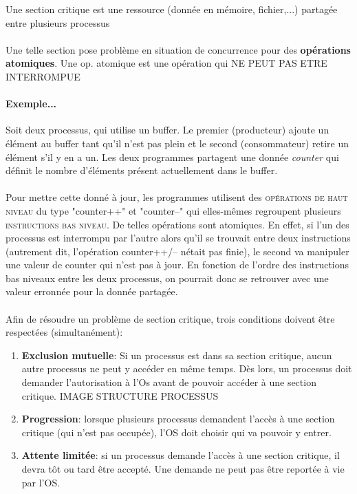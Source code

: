 \item{}
{
 Une section critique est une ressource (donnée en mémoire, fichier,...) partagée entre plusieurs processus
\paragraph{}
Une telle section pose problème en situation de concurrence pour des \textbf{opérations atomiques}. Une op. atomique est une opération qui NE PEUT PAS ETRE INTERROMPUE
\paragraph{Exemple...}Soit deux processus, qui utilise un buffer. Le premier (producteur) ajoute un élément au buffer tant qu'il n'est pas plein et le second (consommateur) retire un élément s'il y en a un. Les deux programmes partagent une donnée \textit{counter} qui définit le nombre d'éléments présent actuellement dans le buffer.
\paragraph{}Pour mettre cette donné à jour, les programmes utilisent des \textsc{opérations de haut niveau} du type "counter++" et "counter--" qui elles-mêmes regroupent plusieurs \textsc{instructions bas niveau}. De telles opérations sont atomiques. En effet, si l'un des processus est interrompu par l'autre alors qu'il se trouvait entre deux instructions (autrement dit, l'opération counter++/-- nétait pas finie), le second va manipuler une valeur de counter qui n'est pas à jour. En fonction de l'ordre des instructions bas niveaux entre les deux processus, on pourrait donc se retrouver avec une valeur erronnée pour la donnée partagée.

\paragraph{}Afin de résoudre un problème de section critique, trois conditions doivent être respectées (simultanément):
\begin{enumerate}
\item \textbf{Exclusion mutuelle}: Si un processus est dans sa section critique, aucun autre processus ne peut y accéder en même temps. Dès lors, un processus doit demander l'autorisation à l'Os avant de pouvoir accéder à une section critique. IMAGE STRUCTURE PROCESSUS
\item \textbf{Progression}: lorsque plusieurs processus demandent l'accès à une section critique (qui n'est pas occupée), l'OS doit choisir qui va pouvoir y entrer.
\item \textbf{Attente limitée}: si un processus demande l'accès à une section critique, il devra tôt ou tard être accepté. Une demande ne peut pas être reportée à vie par l'OS.
\end{enumerate}

}
